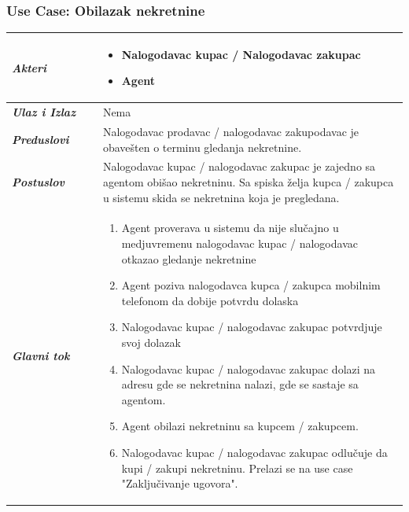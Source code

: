 \documentclass[20pt]{article}
\begin{document}
\subsubsection{\bfseries \large Use Case: Obilazak nekretnine}
\begin{center}
\begin{tabular}{p{0.23\linewidth} p{0.77\linewidth}}
 \hline
 {\it \bfseries Akteri} & \begin{itemize}
    \item Nalogodavac kupac / Nalogodavac zakupac
    \item Agent
\end{itemize}\\
\hline

 {\it \bfseries Ulaz i Izlaz} & Nema\\   
 \hline
 
 {\it \bfseries Preduslovi} & Nalogodavac prodavac / nalogodavac zakupodavac je obave\v sten o terminu gledanja nekretnine.\\
 \hline
 
 {\it \bfseries Postuslov} & Nalogodavac kupac / nalogodavac zakupac je zajedno sa agentom obi\v sao nekretninu. Sa spiska \v zelja kupca / zakupca u sistemu skida se nekretnina koja je pregledana.\\
 \hline


     {\it \bfseries Glavni tok} &  
     \begin{enumerate}
         \item  Agent proverava u sistemu da nije slu\v cajno u medjuvremenu nalogodavac kupac / nalogodavac otkazao gledanje nekretnine
         \item  Agent poziva nalogodavca kupca / zakupca mobilnim telefonom da dobije potvrdu dolaska
         \item  Nalogodavac kupac / nalogodavac zakupac potvrdjuje svoj dolazak
         \item  Nalogodavac kupac / nalogodavac zakupac dolazi na adresu gde se nekretnina nalazi, gde se sastaje sa agentom.
         \item Agent obilazi nekretninu sa kupcem / zakupcem.
         \item Nalogodavac kupac / nalogodavac zakupac odlu\v cuje da kupi / zakupi nekretninu. Prelazi se na use case "Zaklju\v civanje ugovora".
    \end{enumerate}\\
 \hline
\end{tabular}
\end{center}
\end{document}
